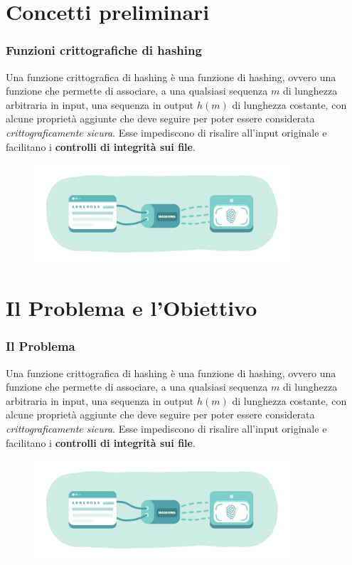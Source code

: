 \documentclass{beamer}
\begin{document}
\section{Concetti preliminari}
\begin{frame}
	\frametitle{Funzioni crittografiche di hashing}
	Una funzione crittografica di hashing è una funzione di hashing, ovvero
	una funzione che permette di associare,
	a una qualsiasi sequenza \(m\) di lunghezza arbitraria in input, una sequenza
	in output \(h(m)\) di lunghezza costante,
	con alcune proprietà aggiunte che deve seguire per poter essere considerata
	\emph{crittograficamente sicura}. Esse impediscono di risalire all'input originale
	e facilitano i \textbf{controlli di integrità sui file}.
	\medskip
	\begin{figure}
		\includegraphics[width=0.85\textwidth]{figures/hashing.jpg}
	\end{figure}
\end{frame}

\section{Il Problema e l'Obiettivo}
\begin{frame}
	\frametitle{Il Problema}
	Una funzione crittografica di hashing è una funzione di hashing, ovvero
	una funzione che permette di associare,
	a una qualsiasi sequenza \(m\) di lunghezza arbitraria in input, una sequenza
	in output \(h(m)\) di lunghezza costante,
	con alcune proprietà aggiunte che deve seguire per poter essere considerata
	\emph{crittograficamente sicura}. Esse impediscono di risalire all'input originale
	e facilitano i \textbf{controlli di integrità sui file}.
	\medskip
	\begin{figure}
		\includegraphics[width=0.85\textwidth]{figures/hashing.jpg}
	\end{figure}
\end{frame}
\end{document}
